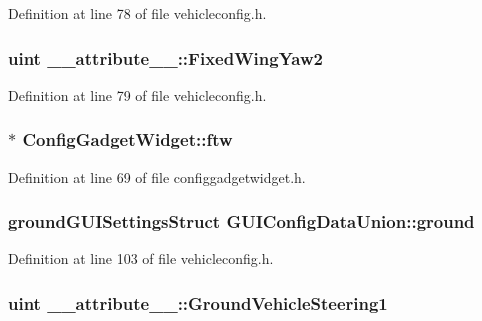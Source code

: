 Definition at line 78 of file vehicleconfig.\-h.

\hypertarget{group___config_plugin_ga0f87bb28c2fe43ab7616b7322ac21106}{
\subsubsection[{Fixed\-Wing\-Yaw2}]{\setlength{\rightskip}{0pt plus 5cm}uint \-\_\-\-\_\-attribute\-\_\-\-\_\-\-::\-Fixed\-Wing\-Yaw2}}\label{group___config_plugin_ga0f87bb28c2fe43ab7616b7322ac21106}


Definition at line 79 of file vehicleconfig.\-h.

\hypertarget{group___config_plugin_ga86b1da74559f7e5f1e68bf0360b06dc5}{
\subsubsection[{ftw}]{$\ast$ Config\-Gadget\-Widget\-::ftw\hspace{0.3cm}{\ttfamily [protected]}}}\label{group___config_plugin_ga86b1da74559f7e5f1e68bf0360b06dc5}


Definition at line 69 of file configgadgetwidget.\-h.

\hypertarget{group___config_plugin_ga27dfb53cf12c8f8bb3a869bdfa8c11cf}{
\subsubsection[{ground}]{\setlength{\rightskip}{0pt plus 5cm}ground\-G\-U\-I\-Settings\-Struct G\-U\-I\-Config\-Data\-Union\-::ground}}\label{group___config_plugin_ga27dfb53cf12c8f8bb3a869bdfa8c11cf}


Definition at line 103 of file vehicleconfig.\-h.

\hypertarget{group___config_plugin_gad4fe3d4d30764b30210253be62bb0974}{
\subsubsection[{Ground\-Vehicle\-Steering1}]{\setlength{\rightskip}{0pt plus 5cm}uint \-\_\-\-\_\-attribute\-\_\-\-\_\-\-::\-Ground\-Vehicle\-Steering1}}\label{group___config_plugin_gad4fe3d4d30764b30210253be62bb0974}


